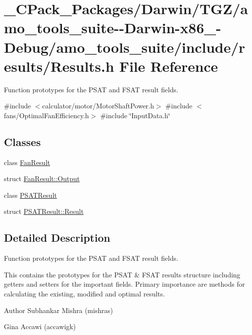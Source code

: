 \hypertarget{___c_pack___packages_2_darwin_2_t_g_z_2amo__tools__suite--_darwin-x86__64-_debug_2amo__tools__sua07725fe7fb18bec26a1dfcfa4056c39}{}\section{\+\_\+\+C\+Pack\+\_\+\+Packages/\+Darwin/\+T\+G\+Z/amo\+\_\+tools\+\_\+suite-\/-\/\+Darwin-\/x86\+\_-\/\+Debug/amo\+\_\+tools\+\_\+suite/include/results/\+Results.h File Reference}
\label{___c_pack___packages_2_darwin_2_t_g_z_2amo__tools__suite--_darwin-x86__64-_debug_2amo__tools__sua07725fe7fb18bec26a1dfcfa4056c39}


Function prototypes for the P\+S\+AT and F\+S\+AT result fields.  


{\ttfamily \#include $<$calculator/motor/\+Motor\+Shaft\+Power.\+h$>$}\newline
{\ttfamily \#include $<$fans/\+Optimal\+Fan\+Efficiency.\+h$>$}\newline
{\ttfamily \#include \char`\"{}Input\+Data.\+h\char`\"{}}\newline
\subsection*{Classes}
\begin{DoxyCompactItemize}
\item 
class \hyperlink{class_fan_result}{Fan\+Result}
\item 
struct \hyperlink{struct_fan_result_1_1_output}{Fan\+Result\+::\+Output}
\item 
class \hyperlink{class_p_s_a_t_result}{P\+S\+A\+T\+Result}
\item 
struct \hyperlink{struct_p_s_a_t_result_1_1_result}{P\+S\+A\+T\+Result\+::\+Result}
\end{DoxyCompactItemize}


\subsection{Detailed Description}
Function prototypes for the P\+S\+AT and F\+S\+AT result fields. 

This contains the prototypes for the P\+S\+AT \& F\+S\+AT results structure including getters and setters for the important fields. Primary importance are methods for calculating the existing, modified and optimal results.

\begin{DoxyAuthor}{Author}
Subhankar Mishra (mishras) 

Gina Accawi (accawigk) 
\end{DoxyAuthor}
